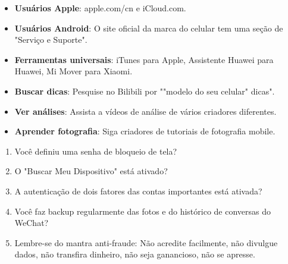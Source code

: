 

\begin{itemize}
  \item \textbf{Usuários Apple}: apple.com/cn e iCloud.com.
  \item \textbf{Usuários Android}: O site oficial da marca do celular tem uma seção de "Serviço e Suporte".
  \item \textbf{Ferramentas universais}: iTunes para Apple, Assistente Huawei para Huawei, Mi Mover para Xiaomi.
\end{itemize}


\begin{itemize}
  \item \textbf{Buscar dicas}: Pesquise no Bilibili por ""modelo do seu celular" dicas".
  \item \textbf{Ver análises}: Assista a vídeos de análise de vários criadores diferentes.
  \item \textbf{Aprender fotografia}: Siga criadores de tutoriais de fotografia mobile.
\end{itemize}


\begin{enumerate}
  \item Você definiu uma senha de bloqueio de tela?
  \item O "Buscar Meu Dispositivo" está ativado?
  \item A autenticação de dois fatores das contas importantes está ativada?
  \item Você faz backup regularmente das fotos e do histórico de conversas do WeChat?
  \item Lembre-se do mantra anti-fraude: Não acredite facilmente, não divulgue dados, não transfira dinheiro, não seja ganancioso, não se apresse.
\end{enumerate}
